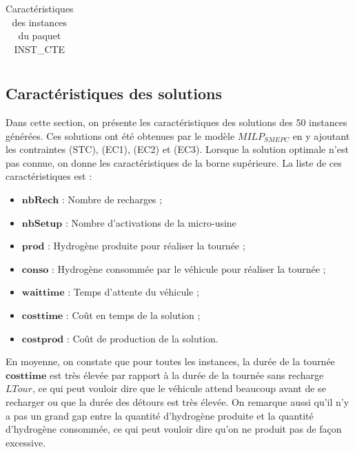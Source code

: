 {\begin{table}[H]
{\begin{tabular}{|r|r|r|r|r|r|r|r|r|r|}
			\bottomrule
		\end{tabular}%
	}\caption{Caractéristiques des instances du paquet INST\_CTE}
	\label{tab:inst2}%
\end{table}%


\subsection{Caractéristiques des solutions}
Dans cette section, on présente les caractéristiques des solutions des 50 instances générées. Ces solutions ont été obtenues par le modèle $MILP_{SMEPC}$ en y ajoutant les contraintes (STC), (EC1), (EC2) et (EC3). Lorsque la solution optimale n'est pas connue, on donne les caractéristiques de la borne supérieure. La liste de ces caractéristiques est :
\begin{itemize}[label=$\square$]
	\item $\mathbf{nbRech}$ : Nombre de recharges ;
	\item $\mathbf{nbSetup}$ : Nombre d'activations de la micro-usine
	\item $\mathbf{prod}$ : Hydrogène produite pour réaliser la tournée ;
	\item  $\mathbf{conso} $ :  Hydrogène consommée par le véhicule pour réaliser la tournée ;
	\item $\mathbf{wait time}$ : Temps d'attente du véhicule ;
	\item $\mathbf{cost time}$ : Coût en temps de la solution ;
	 \item $\mathbf{cost prod}$ : Coût de production de la solution.
\end{itemize}

En moyenne, on constate que pour toutes les instances, la durée de la tournée $\mathbf{cost time}$ est très élevée par rapport à la durée de la tournée sans recharge  $LTour$, ce qui peut vouloir dire que le véhicule attend \og beaucoup \fg{} avant de se recharger ou que la durée des détours est très élevée. On remarque aussi qu'il n'y a pas un grand gap entre la quantité d'hydrogène produite et la quantité d'hydrogène consommée, ce qui peut vouloir dire qu'on ne produit pas de façon excessive.

}
